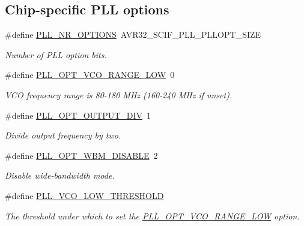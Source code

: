 \subsection*{\-Chip-\/specific \-P\-L\-L options}
\begin{DoxyCompactItemize}
\item 
\#define \hyperlink{group__pll__group_gae74457d5b4073fdb82cb6b9f3d8b76e2}{\-P\-L\-L\-\_\-\-N\-R\-\_\-\-O\-P\-T\-I\-O\-N\-S}~\-A\-V\-R32\-\_\-\-S\-C\-I\-F\-\_\-\-P\-L\-L\-\_\-\-P\-L\-L\-O\-P\-T\-\_\-\-S\-I\-Z\-E
\begin{DoxyCompactList}\small\item\em \-Number of \-P\-L\-L option bits. \end{DoxyCompactList}\item 
\#define \hyperlink{group__pll__group_ga03717c32c87c59df4b94a4233a5c2e3e}{\-P\-L\-L\-\_\-\-O\-P\-T\-\_\-\-V\-C\-O\-\_\-\-R\-A\-N\-G\-E\-\_\-\-L\-O\-W}~0
\begin{DoxyCompactList}\small\item\em \-V\-C\-O frequency range is 80-\/180 \-M\-Hz (160-\/240 \-M\-Hz if unset). \end{DoxyCompactList}\item 
\#define \hyperlink{group__pll__group_ga0ab4eb3395991501ba1c8aa8a7c606be}{\-P\-L\-L\-\_\-\-O\-P\-T\-\_\-\-O\-U\-T\-P\-U\-T\-\_\-\-D\-I\-V}~1
\begin{DoxyCompactList}\small\item\em \-Divide output frequency by two. \end{DoxyCompactList}\item 
\#define \hyperlink{group__pll__group_gaa2d0c945bda195002b421eb79d2c87ca}{\-P\-L\-L\-\_\-\-O\-P\-T\-\_\-\-W\-B\-M\-\_\-\-D\-I\-S\-A\-B\-L\-E}~2
\begin{DoxyCompactList}\small\item\em \-Disable wide-\/bandwidth mode. \end{DoxyCompactList}\item 
\#define \hyperlink{group__pll__group_ga49eaeabf6add7c1be4000c77cb8b2bff}{\-P\-L\-L\-\_\-\-V\-C\-O\-\_\-\-L\-O\-W\-\_\-\-T\-H\-R\-E\-S\-H\-O\-L\-D}
\begin{DoxyCompactList}\small\item\em \-The threshold under which to set the \hyperlink{group__pll__group_ga03717c32c87c59df4b94a4233a5c2e3e}{\-P\-L\-L\-\_\-\-O\-P\-T\-\_\-\-V\-C\-O\-\_\-\-R\-A\-N\-G\-E\-\_\-\-L\-O\-W} option. \end{DoxyCompactList}\end{DoxyCompactItemize}


